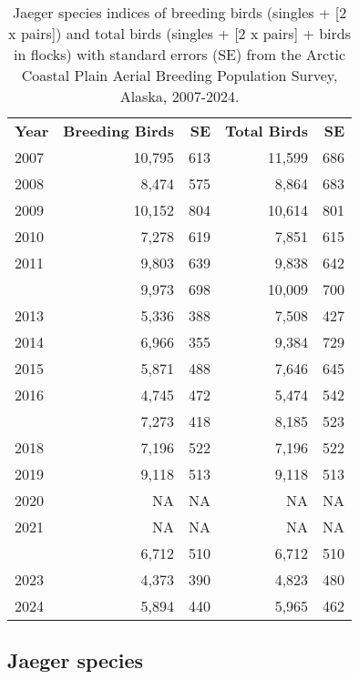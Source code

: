 \documentclass[
]{article}
\begin{document}
\begin{longtable}[t]{lrrrr}

\caption{\label{tbl-JAEG}Jaeger species indices of breeding birds
(singles + {[}2 x pairs{]}) and total birds (singles + {[}2 x pairs{]} +
birds in flocks) with standard errors (SE) from the Arctic Coastal Plain
Aerial Breeding Population Survey, Alaska, 2007-2024.}

\tabularnewline

\\
\toprule
\textbf{Year} & \textbf{Breeding Birds} & \textbf{SE} & \textbf{Total Birds} & \textbf{SE}\\
\midrule
2007 & 10,795 & 613 & 11,599 & 686\\
2008 & 8,474 & 575 & 8,864 & 683\\
2009 & 10,152 & 804 & 10,614 & 801\\
2010 & 7,278 & 619 & 7,851 & 615\\
2011 & 9,803 & 639 & 9,838 & 642\\
\addlinespace
2012 & 9,973 & 698 & 10,009 & 700\\
2013 & 5,336 & 388 & 7,508 & 427\\
2014 & 6,966 & 355 & 9,384 & 729\\
2015 & 5,871 & 488 & 7,646 & 645\\
2016 & 4,745 & 472 & 5,474 & 542\\
\addlinespace
2017 & 7,273 & 418 & 8,185 & 523\\
2018 & 7,196 & 522 & 7,196 & 522\\
2019 & 9,118 & 513 & 9,118 & 513\\
2020 & NA & NA & NA & NA\\
2021 & NA & NA & NA & NA\\
\addlinespace
2022 & 6,712 & 510 & 6,712 & 510\\
2023 & 4,373 & 390 & 4,823 & 480\\
2024 & 5,894 & 440 & 5,965 & 462\\
\bottomrule

\end{longtable}

\endgroup{}

\newpage{}

\subsection*{Jaeger species}\label{jaeger-species-2}
\end{document}
